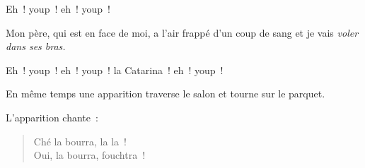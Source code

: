 \documentclass[french,twoside]{book} %
\newenvironment{quoteblock}%
  {\begin{quoting}}
  {\end{quoting}}
\newenvironment{quotebar}{%
    \def\FrameCommand{{\color{rubric!10!}\vrule width 0.5em} \hspace{0.9em}}%
    \def\OuterFrameSep{\itemsep} %
    \MakeFramed {\advance\hsize-\width \FrameRestore}
  }%
  {%
    \endMakeFramed
  }
\renewenvironment{quoteblock}%
  {%
    \savenotes
    \setstretch{0.9}
    \normalfont
    \begin{quotebar}
  }
  {%
    \end{quotebar}
    \spewnotes
  }
\begin{document}
\begin{quoteblock}
\noindent Eh ! youp ! eh ! youp !\end{quoteblock}

\noindent Mon père, qui est en face de moi, a l’air frappé d’un coup de sang et je vais \emph{voler dans ses bras.}\par

\begin{quoteblock}
\noindent Eh ! youp ! eh ! youp ! la Catarina ! eh ! youp !\end{quoteblock}

\noindent En même temps une apparition traverse le salon et tourne sur le parquet.\par
L’apparition chante :\par


\begin{verse}
Ché la bourra, la la !\\
Oui, la bourra, fouchtra !\\
\end{verse}
\end{document}
